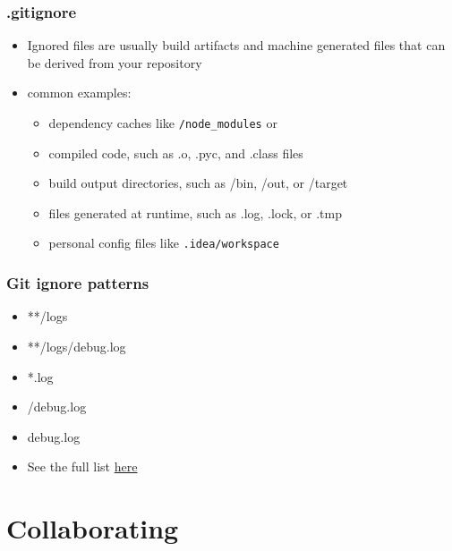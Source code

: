 \documentclass[12pt]{beamer}
\begin{document}
\begin{frame}
\frametitle{.gitignore}
\begin{itemize}
	\item Ignored files are usually build artifacts and machine generated files that can be derived from your repository 
	\item common examples:
	\begin{itemize}
		\item dependency caches like \texttt{/node\_modules} or  
		\item compiled code, such as .o, .pyc, and .class files
		\item build output directories, such as /bin, /out, or /target
		\item files generated at runtime, such as .log, .lock, or .tmp
		\item personal config files like \texttt{.idea/workspace}
	\end{itemize}
\end{itemize}
\end{frame}

\begin{frame}
\frametitle{Git ignore patterns}
\begin{itemize}
	\item **/logs
	\item **/logs/debug.log
	\item *.log
	\item /debug.log
	\item debug.log
	\item See the full list \href{https://www.atlassian.com/git/tutorials/saving-changes/gitignore}{here}
\end{itemize}
\end{frame}

\section{Collaborating}
\end{document}
